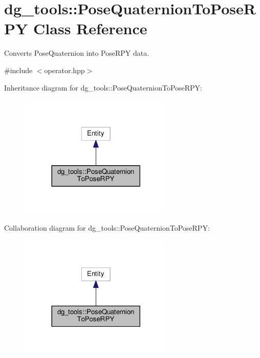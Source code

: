 \hypertarget{classdg__tools_1_1PoseQuaternionToPoseRPY}{}\section{dg\+\_\+tools\+:\+:Pose\+Quaternion\+To\+Pose\+R\+PY Class Reference}
\label{classdg__tools_1_1PoseQuaternionToPoseRPY}


Converts Pose\+Quaternion into Pose\+R\+PY data.  




{\ttfamily \#include $<$operator.\+hpp$>$}



Inheritance diagram for dg\+\_\+tools\+:\+:Pose\+Quaternion\+To\+Pose\+R\+PY\+:
\nopagebreak
\begin{figure}[H]
\begin{center}
\leavevmode
\includegraphics[width=209pt]{classdg__tools_1_1PoseQuaternionToPoseRPY__inherit__graph}
\end{center}
\end{figure}


Collaboration diagram for dg\+\_\+tools\+:\+:Pose\+Quaternion\+To\+Pose\+R\+PY\+:
\nopagebreak
\begin{figure}[H]
\begin{center}
\leavevmode
\includegraphics[width=209pt]{classdg__tools_1_1PoseQuaternionToPoseRPY__coll__graph}
\end{center}
\end{figure}
